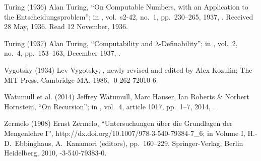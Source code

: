  Turing (1936)
Alan Turing,
``On Computable Numbers,
 with an Application to the Entscheidungsproblem'';
in ,
vol.\ s2-42, no.\ 1, pp.\ 230--265, 1937,
.
Received 28 May, 1936. Read 12 November, 1936.

 Turing (1937)
Alan Turing,
``Computability and $\lambda$-Definability''; in
,
vol.\ 2, no.\ 4, pp.\ 153--163, December 1937,
.

 Vygotsky (1934)
Lev Vygotsky,
,
newly revised and edited by Alex Kozulin;
The MIT Press, Cambridge MA, 1986,
-0-262-72010-6.

 Watumull et al. (2014)
Jeffrey Watumull, Marc Hauser, Ian Roberts \& Norbert Hornstein,
``On Recursion''; in
,
vol.\ 4, article 1017, pp.\ 1--7, 2014,
.

 Zermelo (1908)
Ernst Zermelo,
``Untersuchungen \"uber die Grundlagen der Mengenlehre I'',
%
{http://dx.doi.org/10.1007/978-3-540-79384-7_6};
in  Volume I,
H.-D.\ Ebbinghaus, A.\ Kanamori (editors),
pp.\ 160--229,
Springer-Verlag, Berlin Heidelberg, 2010,
-3-540-79383-0.

\endinput
